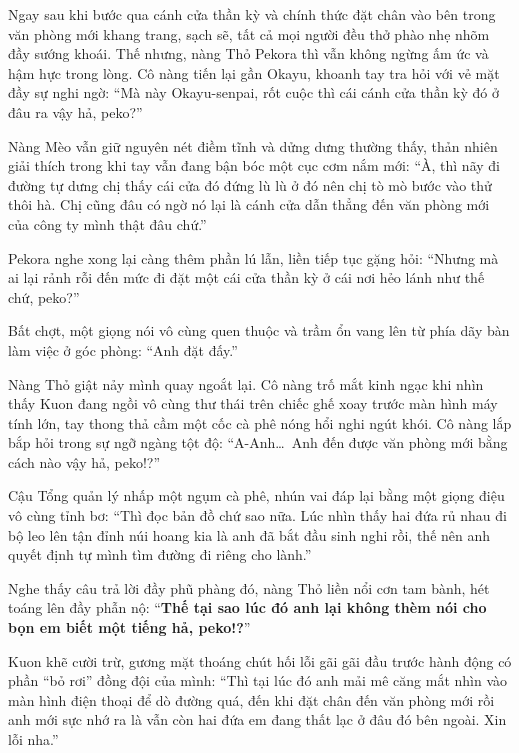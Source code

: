 \documentclass[../main.tex]{subfiles}
\begin{document}
\omk

Ngay sau khi bước qua cánh cửa thần kỳ và chính thức đặt chân vào bên trong văn phòng mới khang trang, sạch sẽ, tất cả mọi người đều thở phào nhẹ nhõm đầy sướng khoái. Thế nhưng, nàng Thỏ Pekora thì vẫn không ngừng ấm ức và hậm hực trong lòng. Cô nàng tiến lại gần Okayu, khoanh tay tra hỏi với vẻ mặt đầy sự nghi ngờ: ``Mà này Okayu-senpai, rốt cuộc thì cái cánh cửa thần kỳ đó ở đâu ra vậy hả, peko?''

Nàng Mèo vẫn giữ nguyên nét điềm tĩnh và dửng dưng thường thấy, thản nhiên giải thích trong khi tay vẫn đang bận bóc một cục cơm nắm mới: ``À, thì nãy đi đường tự dưng chị thấy cái cửa đó đứng lù lù ở đó nên chị tò mò bước vào thử thôi hà. Chị cũng đâu có ngờ nó lại là cánh cửa dẫn thẳng đến văn phòng mới của công ty mình thật đâu chứ.''

Pekora nghe xong lại càng thêm phần lú lẫn, liền tiếp tục gặng hỏi: ``Nhưng mà ai lại rảnh rỗi đến mức đi đặt một cái cửa thần kỳ ở cái nơi hẻo lánh như thế chứ, peko?''

Bất chợt, một giọng nói vô cùng quen thuộc và trầm ổn vang lên từ phía dãy bàn làm việc ở góc phòng: ``Anh đặt đấy.''

Nàng Thỏ giật nảy mình quay ngoắt lại. Cô nàng trố mắt kinh ngạc khi nhìn thấy Kuon đang ngồi vô cùng thư thái trên chiếc ghế xoay trước màn hình máy tính lớn, tay thong thả cầm một cốc cà phê nóng hổi nghi ngút khói. Cô nàng lắp bắp hỏi trong sự ngỡ ngàng tột độ: ``A-Anh\dots\ Anh đến được văn phòng mới bằng cách nào vậy hả, peko!?''

Cậu Tổng quản lý nhấp một ngụm cà phê, nhún vai đáp lại bằng một giọng điệu vô cùng tỉnh bơ: ``Thì đọc bản đồ chứ sao nữa. Lúc nhìn thấy hai đứa rủ nhau đi bộ leo lên tận đỉnh núi hoang kia là anh đã bắt đầu sinh nghi rồi, thế nên anh quyết định tự mình tìm đường đi riêng cho lành.''

Nghe thấy câu trả lời đầy phũ phàng đó, nàng Thỏ liền nổi cơn tam bành, hét toáng lên đầy phẫn nộ: ``\textbf{Thế tại sao lúc đó anh lại không thèm nói cho bọn em biết một tiếng hả, peko!?}''

Kuon khẽ cười trừ, gương mặt thoáng chút hối lỗi gãi gãi đầu trước hành động có phần ``bỏ rơi'' đồng đội của mình: ``Thì tại lúc đó anh mải mê căng mắt nhìn vào màn hình điện thoại để dò đường quá, đến khi đặt chân đến văn phòng mới rồi anh mới sực nhớ ra là vẫn còn hai đứa em đang thất lạc ở đâu đó bên ngoài. Xin lỗi nha.''
\end{document}
